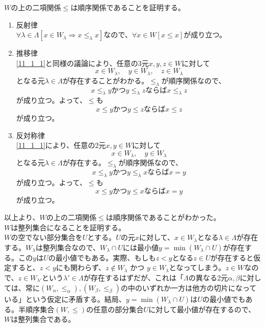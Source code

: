 \documentclass{jsarticle}
\begin{document}
\subsubsection{}
$W$の上の二項関係$\leq$は順序関係であることを証明する。
\begin{enumerate}
\item{反射律}\\
$\forall\lambda\in\Lambda[x\in W_\lambda\Longrightarrow x\leq_\lambda x]$なので、$\forall x\in W[x\leq x]$が成り立つ。

\item{推移律}\\
\ref{11_1_1}と同様の議論により、任意の3元$x,y,z\in W$に対して
\[x\in W_\lambda,\quad y\in W_\lambda,\quad z\in W_\lambda\]
となる元$\lambda\in\Lambda$が存在することがわかる。$\leq_\lambda$が順序関係なので、
\[x\leq_\lambda y かつ y\leq_\lambda z ならば x\leq_\lambda z\]
が成り立つ。よって、$\leq$も
\[x\leq y かつ y\leq z ならば x\leq z\]
が成り立つ。

\item{反対称律}\\
\ref{11_1_1}により、任意の2元$x,y\in W$に対して
\[x\in W_\lambda,\quad y\in W_\lambda\]
となる元$\lambda\in\Lambda$が存在する。$\leq_\lambda$が順序関係なので、
\[x\leq_\lambda y かつ y\leq_\lambda x ならば x=y\]
が成り立つ。よって、$\leq$も
\[x\leq y かつ y\leq x ならば x=y\]
が成り立つ。\\
\end{enumerate}
以上より、$W$の上の二項関係$\leq$は順序関係であることがわかった。\\

$W$は整列集合になることを証明する。\\
$W$の空でない部分集合を$U$とする。$U$の元$x$に対して、$x\in W_\lambda$となる$\lambda\in\Lambda$が存在する。$W_\lambda$は整列集合なので、$W_\lambda\cap U$には最小値$y=\min(W_\lambda\cap U)$が存在する。この$y$は$U$の最小値でもある。実際、もしも$z<y$となる$z\in U$が存在すると仮定すると、$z<y$にも関わらず、$z\notin W_\lambda$ かつ $y\in W_\lambda$となってしまう。$z\in W$なので、$z\in W_{\lambda'}$という$\lambda'\in\Lambda$が存在するはずだが、これは「$\Lambda$の異なる2元$\alpha,\beta$に対しては、常に$(W_\alpha,\leq_\alpha),(W_\beta,\leq_\beta)$の中のいずれか一方は他方の切片になっている」という仮定に矛盾する。結局、$y=\min(W_\lambda\cap U)$は$U$の最小値でもある。半順序集合$(W,\leq)$の任意の部分集合$U$に対して最小値が存在するので、$W$は整列集合である。
\end{document}
